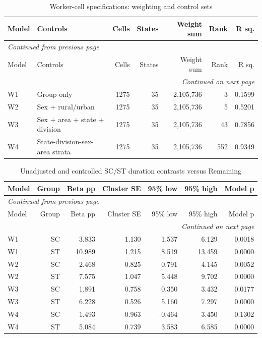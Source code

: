 \documentclass[11pt,a4paper]{report}
\begin{document}
\begingroup\footnotesize\setlength{\tabcolsep}{4pt}
\begin{longtable}{l>{\raggedright\arraybackslash}p{5cm}rrrrr}
\caption{Worker-cell specifications: weighting and control sets}\\\toprule
Model & Controls & Cells & States & Weight sum & Rank & R sq. \\\midrule\endfirsthead
\multicolumn{7}{l}{\textit{Continued from previous page}}\\\toprule
Model & Controls & Cells & States & Weight sum & Rank & R sq. \\\midrule\endhead
\midrule\multicolumn{7}{r}{\textit{Continued on next page}}\\\endfoot\bottomrule\endlastfoot
W1 & Group only & 1275 & 35 & 2,105,736 & 3 & 0.1599 \\
W2 & Sex + rural/\allowbreak{}urban & 1275 & 35 & 2,105,736 & 5 & 0.5201 \\
W3 & Sex + area + state + division & 1275 & 35 & 2,105,736 & 43 & 0.7856 \\
W4 & State-division-sex-area strata & 1275 & 35 & 2,105,736 & 552 & 0.9349 \\
\end{longtable}\endgroup
\begingroup\footnotesize\setlength{\tabcolsep}{4pt}
\begin{longtable}{lrrrrrr}
\caption{Unadjusted and controlled SC/\allowbreak{}ST duration contrasts versus Remaining}\\\toprule
Model & Group & Beta pp & Cluster SE & 95\% low & 95\% high & Model p \\\midrule\endfirsthead
\multicolumn{7}{l}{\textit{Continued from previous page}}\\\toprule
Model & Group & Beta pp & Cluster SE & 95\% low & 95\% high & Model p \\\midrule\endhead
\midrule\multicolumn{7}{r}{\textit{Continued on next page}}\\\endfoot\bottomrule\endlastfoot
W1 & SC & 3.833 & 1.130 & 1.537 & 6.129 & 0.0018 \\
W1 & ST & 10.989 & 1.215 & 8.519 & 13.459 & 0.0000 \\
W2 & SC & 2.468 & 0.825 & 0.791 & 4.145 & 0.0052 \\
W2 & ST & 7.575 & 1.047 & 5.448 & 9.702 & 0.0000 \\
W3 & SC & 1.891 & 0.758 & 0.350 & 3.432 & 0.0177 \\
W3 & ST & 6.228 & 0.526 & 5.160 & 7.297 & 0.0000 \\
W4 & SC & 1.493 & 0.963 & -0.464 & 3.450 & 0.1302 \\
W4 & ST & 5.084 & 0.739 & 3.583 & 6.585 & 0.0000 \\
\end{longtable}\endgroup
\end{document}
